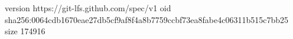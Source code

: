 version https://git-lfs.github.com/spec/v1
oid sha256:0064cdb1670eae27db5cf9af8f4a8b7759ccbf73ea8fabe4c06311b515c7bb25
size 174916
